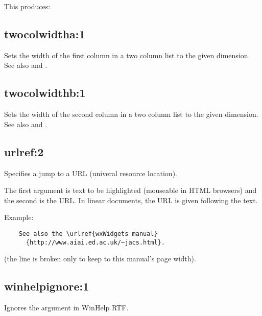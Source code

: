 This produces:

\begin{twocollist}
\end{twocollist}

\subsection*{twocolwidtha:1}\label{twocolwidtha}

Sets the width of the first column in a two column list to the given
dimension. See also  and .

\subsection*{twocolwidthb:1}\label{twocolwidthb}

Sets the width of the second column in a two column list to the given
dimension. See also  and .

\subsection*{urlref:2}\label{urlref}

Specifies a jump to a URL (univeral resource location).

The first argument is text to be highlighted (mouseable in HTML browsers)
and the second is the URL. In linear documents, the URL
is given following the text.

Example:

\begin{verbatim}
    See also the \urlref{wxWidgets manual}
      {http://www.aiai.ed.ac.uk/~jacs.html}.
\end{verbatim}

(the line is broken only to keep to this manual's page width).

\subsection*{winhelpignore:1}\label{winhelpignore}

Ignores the argument in WinHelp RTF.

